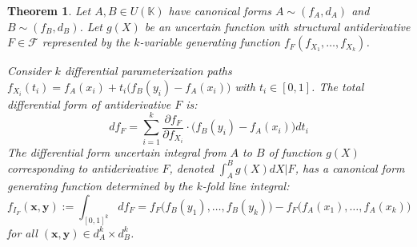 \documentclass[a4paper,12pt, twoside]{memoir}
\newtheorem{theorem}{Theorem}[chapter]
\begin{document}
\begin{theorem}
	Let $A, B \in U(\mathbb{K})$ have canonical forms $A \sim (f_A, d_A)$ and $B \sim (f_B, d_B)$. Let $g(X)$ be an uncertain function with structural antiderivative $F \in \mathcal{F}$ represented by the $k$-variable generating function $f_F(f_{X_1}, \dots, f_{X_k})$.

	Consider $k$ differential parameterization paths $f_{X_i}(t_i) = f_A(x_i) + t_i\big(f_B(y_i) - f_A(x_i)\big)$ with $t_i \in [0, 1]$. The total differential form of antiderivative $F$ is:
	\[
		d f_F = \sum_{i=1}^{k} \frac{\partial f_F}{\partial f_{X_i}} \cdot \big(f_B(y_i) - f_A(x_i)\big) dt_i
	\]
	The differential form uncertain integral from $A$ to $B$ of function $g(X)$ corresponding to antiderivative $F$, denoted $\int_A^B g(X)dX \Big| F$, has a canonical form generating function determined by the $k$-fold line integral:
	\[
		f_{I_F}(\mathbf{x}, \mathbf{y}) := \int_{[0, 1]^k} d f_F = f_F\big(f_B(y_1), \dots, f_B(y_k)\big) - f_F\big(f_A(x_1), \dots, f_A(x_k)\big)
	\]
	for all $(\mathbf{x}, \mathbf{y}) \in d_A^k \times d_B^k$.
\end{theorem}
\end{document}
